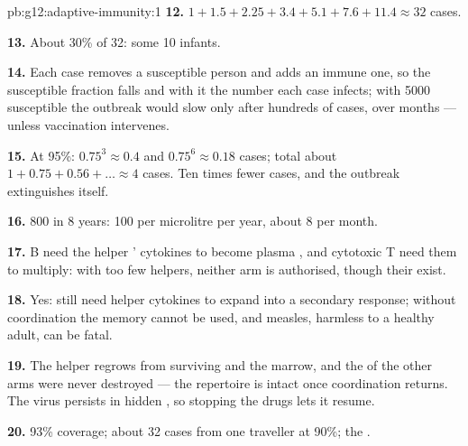 \begin{solution}{pb:g12:adaptive-immunity:1}
\textbf{12.} $1 + 1.5 + 2.25 + 3.4 + 5.1 + 7.6 + 11.4 \approx 32$ cases.

\textbf{13.} About 30\% of 32: some 10 infants.

\textbf{14.} Each case removes a susceptible person and adds an immune
one, so the susceptible fraction falls and with it the number each
case infects; with 5000 susceptible the outbreak would slow only after
hundreds of cases, over months --- unless vaccination intervenes.

\textbf{15.} At 95\%: $0.75^3 \approx 0.4$ and $0.75^6 \approx 0.18$
cases; total about $1 + 0.75 + 0.56 + \dots \approx 4$ cases. Ten
times fewer cases, and the outbreak extinguishes itself.

\textbf{16.} 800 in 8 years: 100 per microlitre per year, about 8 per
month.

\textbf{17.} B  need the helper ' cytokines to become plasma
, and cytotoxic T  need them to multiply: with too few
helpers, neither arm is authorised, though their  exist.

\textbf{18.} Yes:  still need helper cytokines to expand
into a secondary response; without coordination the memory cannot be
used, and measles, harmless to a healthy adult, can be fatal.

\textbf{19.} The helper  regrows from surviving  and
the marrow, and the  of the other arms were never
destroyed --- the repertoire is intact once coordination returns. The
virus persists in hidden , so stopping the drugs lets it resume.

\textbf{20.} 93\% coverage; about 32 cases from one traveller at 90\%;
the .
\end{solution}
